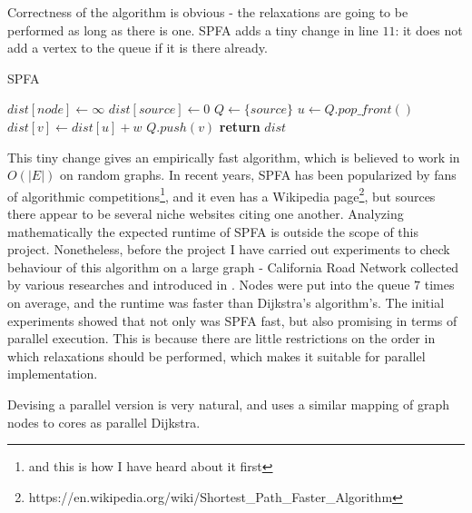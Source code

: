 \documentclass[12pt,a4paper,twoside,openright]{report}
\begin{document}
Correctness of the algorithm is obvious - the relaxations are going to be performed as long as there is one. SPFA adds a tiny change in line $11$: it does not add a vertex to the queue if it is there already.  

\begin{algorithm}
\caption{SPFA}\label{spfa}
\begin{algorithmic}[1]
    \State $dist[node] \gets \infty$
\EndFor
\State $dist[source] \gets 0$
\State $Q \gets \{source\}$ 
        \State $u \gets Q.pop\_front()$
            \State $dist[v] \gets dist[u] + w$
             
                \State $Q.push(v)$
                \EndIf
        \EndIf
      \EndFor
    \EndWhile
\State \textbf{return} $dist$
\EndProcedure
\end{algorithmic}
\end{algorithm}

This tiny change gives an empirically fast algorithm, which is believed to work in $O(|E|)$ on random graphs. In recent years, SPFA has been popularized by fans of algorithmic competitions\footnote{and this is how I have heard about it first}, and it even has a Wikipedia page\footnote{https://en.wikipedia.org/wiki/Shortest\_Path\_Faster\_Algorithm}, but sources there appear to be several niche websites citing one another. Analyzing mathematically the expected runtime of SPFA is outside the scope of this project. Nonetheless, before the project I have carried out experiments to check behaviour of this algorithm on a large graph - California Road Network collected by various researches and introduced in \cite{CRN}. Nodes were put into the queue $7$ times on average, and the runtime was faster than Dijkstra's algorithm's. The initial experiments showed that not only was SPFA fast, but also promising in terms of parallel execution. This is because there are little restrictions on the order in which relaxations should be performed, which makes it suitable for parallel implementation.

Devising a parallel version is very natural, and uses a similar mapping of graph nodes to cores as parallel Dijkstra. 
\end{document}
